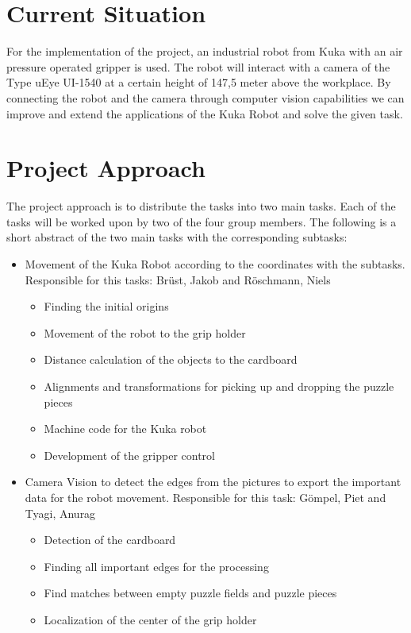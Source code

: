 \documentclass[a4paper, 12pt]{scrartcl}%
\begin{document}
	\section{Current Situation}
	For the implementation of the project, an industrial robot from Kuka with an air pressure operated gripper is used. The robot will interact with a camera of the Type uEye UI-1540 at a certain height of 147,5 meter above the workplace. By connecting the robot and the camera through computer vision capabilities we can improve and extend the applications of the Kuka Robot and solve the given task.\newline
	
	\section{Project Approach}
	The project approach is to distribute the tasks into two main tasks. Each of the tasks will be worked upon by two of the four group members. The following is a short abstract of the two main tasks with the corresponding subtasks:\newline
	\begin{itemize}
		\item Movement of the Kuka Robot according to the coordinates with the subtasks. Responsible for this tasks: Brüst, Jakob and Röschmann, Niels
		\begin{itemize}
			\item Finding the initial origins
			\item Movement of the robot to the grip holder
			\item Distance calculation of the objects to the cardboard
			\item Alignments and transformations for picking up and dropping the puzzle pieces 
			\item Machine code for the Kuka robot
			\item Development of the gripper control 		
		\end{itemize}
		\item Camera Vision to detect the edges from the pictures to export the important data for the robot movement. Responsible for this task: Gömpel, Piet and Tyagi, Anurag
		\begin{itemize}
			\item Detection of the cardboard
			\item Finding all important edges for the processing
			\item Find matches between empty puzzle fields and puzzle pieces
			\item Localization of the center of the grip holder		
		\end{itemize}
	\end{itemize}
\end{document}
